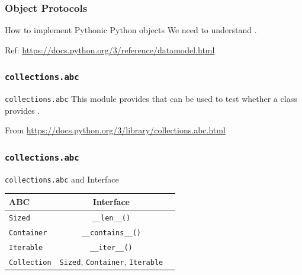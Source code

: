 \documentclass[aspectratio=169,dvipdfmx,12pt,notheorems]{beamer}
\theoremstyle{definition}
\begin{document}
\begin{frame}\frametitle{Object Protocols}

\begin{block}{How to implement Pythonic Python objects}
We need to understand .
\end{block}
Ref: \url{https://docs.python.org/3/reference/datamodel.html}

\end{frame}

\begin{frame}\frametitle{\texttt{collections.abc}}

\begin{block}{\texttt{collections.abc}}
This module provides  that can be used to test whether a class provides .
\end{block}
From \url{https://docs.python.org/3/library/collections.abc.html}

\end{frame}

\begin{frame}\frametitle{\texttt{collections.abc}}

\begin{exampleblock}{\texttt{collections.abc} and Interface}
\begin{table}[h]
\centering
\begin{tabular}{lcr}
\hline
ABC  & Interface \\
\hline
\texttt{Sized}  & \texttt{\_\_len\_\_()} \\
\texttt{Container}  & \texttt{\_\_contains\_\_()} \\
\texttt{Iterable}  &  \texttt{\_\_iter\_\_()} \\
\texttt{Collection}  & \texttt{Sized}, \texttt{Container}, \texttt{Iterable}  \\
\hline
\end{tabular}
\end{table}
\end{exampleblock}

\end{frame}
%
%

\end{document}
